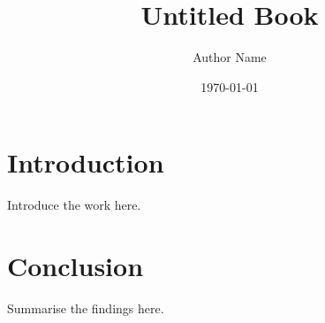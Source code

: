 \documentclass[11pt]{book}
\title{Untitled Book}
\author{Author Name}
\date{\today}
\begin{document}
\maketitle
\tableofcontents

\chapter{Introduction}
Introduce the work here.

\chapter{Conclusion}
Summarise the findings here.
\end{document}
